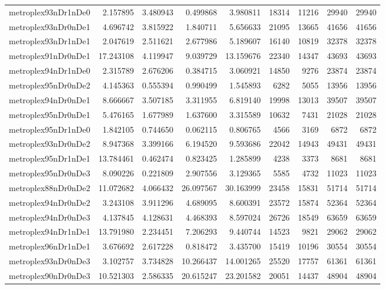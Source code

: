 \begin{longtable}{|l|r|r|r|r|r|r|r|r|}
metroplex93nDr1nDe0 & 2.157895 & 3.480943 & 0.499868 & 3.980811 & 18314 & 11216 & 29940 & 29940 \\
metroplex93nDr0nDe1 & 4.696742 & 3.815922 & 1.840711 & 5.656633 & 21095 & 13665 & 41656 & 41656 \\
metroplex93nDr1nDe1 & 2.047619 & 2.511621 & 2.677986 & 5.189607 & 16140 & 10819 & 32378 & 32378 \\
metroplex91nDr0nDe1 & 17.243108 & 4.119947 & 9.039729 & 13.159676 & 22340 & 14347 & 43693 & 43693 \\
metroplex94nDr1nDe0 & 2.315789 & 2.676206 & 0.384715 & 3.060921 & 14850 & 9276 & 23874 & 23874 \\
metroplex95nDr0nDe2 & 4.145363 & 0.555394 & 0.990499 & 1.545893 & 6282 & 5055 & 13956 & 13956 \\
metroplex94nDr0nDe1 & 8.666667 & 3.507185 & 3.311955 & 6.819140 & 19998 & 13013 & 39507 & 39507 \\
metroplex95nDr0nDe1 & 5.476165 & 1.677989 & 1.637600 & 3.315589 & 10632 & 7431 & 21028 & 21028 \\
metroplex95nDr1nDe0 & 1.842105 & 0.744650 & 0.062115 & 0.806765 & 4566 & 3169 & 6872 & 6872 \\
metroplex93nDr0nDe2 & 8.947368 & 3.399166 & 6.194520 & 9.593686 & 22042 & 14943 & 49431 & 49431 \\
metroplex95nDr1nDe1 & 13.784461 & 0.462474 & 0.823425 & 1.285899 & 4238 & 3373 & 8681 & 8681 \\
metroplex95nDr0nDe3 & 8.090226 & 0.221809 & 2.907556 & 3.129365 & 5585 & 4732 & 11023 & 11023 \\
metroplex88nDr0nDe2 & 11.072682 & 4.066432 & 26.097567 & 30.163999 & 23458 & 15831 & 51714 & 51714 \\
metroplex94nDr0nDe2 & 3.243108 & 3.911296 & 4.689095 & 8.600391 & 23572 & 15874 & 52364 & 52364 \\
metroplex94nDr0nDe3 & 4.137845 & 4.128631 & 4.468393 & 8.597024 & 26726 & 18549 & 63659 & 63659 \\
metroplex94nDr1nDe1 & 13.791980 & 2.234451 & 7.206293 & 9.440744 & 14523 & 9821 & 29062 & 29062 \\
metroplex96nDr1nDe1 & 3.676692 & 2.617228 & 0.818472 & 3.435700 & 15419 & 10196 & 30554 & 30554 \\
metroplex93nDr0nDe3 & 3.102757 & 3.734828 & 10.266437 & 14.001265 & 25520 & 17757 & 61361 & 61361 \\
metroplex90nDr0nDe3 & 10.521303 & 2.586335 & 20.615247 & 23.201582 & 20051 & 14437 & 48904 & 48904 \\

\end{longtable}
